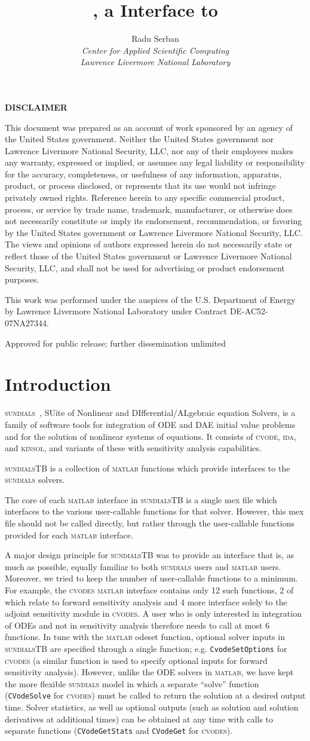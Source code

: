 \documentclass[titlepage,10pt]{article}
\title{{\sundialsTB} {\STBrelease}, a {\matlab} Interface to {\sundials}}
\author{
  Radu Serban \\ 
  {\em Center for Applied Scientific Computing} \\ 
  {\em Lawrence Livermore National Laboratory}
}
\date{
  \today
  \vfill 
  {\centerline{\psfig{figure=doc_logo.eps,width=0.5\textwidth}}}
  \vfill \STBucrl}
\newcommand{\disclaimer}{%
\changetext{.625in}{}{}{}{}
\thispagestyle{empty}%
\vglue5\baselineskip
\begin{center}
{\bf DISCLAIMER}
\end{center}
\noindent
This document was prepared as an account of work sponsored by an agency of 
the United States government. Neither the United States government nor 
Lawrence Livermore National Security, LLC, nor any of their employees makes 
any warranty, expressed or implied, or assumes any legal liability or responsibility 
for the accuracy, completeness, or usefulness of any information, apparatus, product, 
or process disclosed, or represents that its use would not infringe privately owned rights. 
Reference herein to any specific commercial product, process, or service by trade name, 
trademark, manufacturer, or otherwise does not necessarily constitute or imply its endorsement, 
recommendation, or favoring by the United States government or Lawrence Livermore National 
Security, LLC. The views and opinions of authors expressed herein do not necessarily state
or reflect those of the United States government or Lawrence Livermore National Security, LLC, 
and shall not be used for advertising or product endorsement purposes.

\vskip2\baselineskip
\noindent
This work was performed under the auspices of the U.S. Department of Energy by Lawrence 
Livermore National Laboratory under Contract DE-AC52-07NA27344.
\vfill
\begin{center}
Approved for public release; further dissemination unlimited
\end{center}
\clearpage
\changetext{-.625in}{}{}{}{}
}
\newcommand{\clearemptydoublepage}{\newpage{\pagestyle{empty}\cleardoublepage}}
\newcommand{\sundialsTB}{{\normalfont\scshape sundialsTB}}
\newcommand{\sundials}{{\normalfont\scshape sundials}}
\newcommand{\cvode}{{\normalfont\scshape cvode}}
\newcommand{\cvodes}{{\normalfont\scshape cvodes}}
\newcommand{\ida}{{\normalfont\scshape ida}}
\newcommand{\kinsol}{{\normalfont\scshape kinsol}}
\newcommand{\matlab}{{\normalfont\scshape matlab}}
\begin{document}
\pagestyle{empty}
\maketitle
\disclaimer

\tableofcontents

\clearemptydoublepage

\pagestyle{plain}

\section{Introduction}

{\sundials}~\cite{HBGLSSW:04}, SUite of Nonlinear and DIfferential/ALgebraic equation Solvers,
is a family of software tools for integration of ODE and DAE initial value problems
and for the solution of nonlinear systems of equations.
It consists of {\cvode}, {\ida}, and {\kinsol}, and variants of these with 
sensitivity analysis capabilities.

{\sundialsTB} is a collection of {\matlab} functions which provide interfaces to
the {\sundials} solvers.

The core of each {\matlab} interface in {\sundialsTB} is a single {\sc mex} 
file which interfaces to the various user-callable functions for that solver.
However, this {\sc mex} file should not be called directly, but rather through the 
user-callable functions provided for each {\matlab} interface.

A major design principle for {\sundialsTB}
was to provide an interface that is, as much as possible, equally familiar to
both {\sundials} users and {\matlab} users. Moreover, we tried to keep the
number of user-callable functions to a minimum. For example, the {\cvodes} {\matlab} 
interface contains only 12 such functions, 2 of which relate to forward sensitivity analysis and
4 more interface solely to the adjoint sensitivity module in {\cvodes}. 
A user who is only interested in integration of ODEs and not in sensitivity analysis
therefore needs to call at most 6 functions.
In tune with the {\matlab} {\sc odeset} function, optional
solver inputs in {\sundialsTB} are specified through a single function; e.g.
{\tt CvodeSetOptions} for {\cvodes} (a similar function is used to specify optional
inputs for forward sensitivity analysis). However, unlike the ODE solvers in {\matlab}, we
have kept the more flexible {\sundials} model in which a separate ``solve'' function 
({\tt CVodeSolve} for {\cvodes}) must be called to return the solution at a desired 
output time. Solver statistics, as well as optional outputs (such as
solution and solution derivatives at additional times) can be obtained at any time
with calls to separate functions ({\tt CVodeGetStats} and {\tt CVodeGet} for {\cvodes}).
\end{document}
